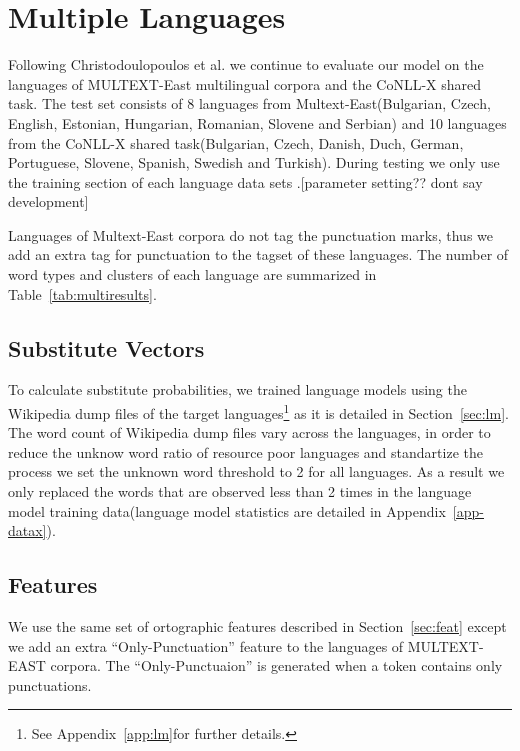 \section{Multiple Languages}
 

Following Christodoulopoulos et
al.  we
continue to evaluate our model on the languages of MULTEXT-East
\cite{citeulike:5820223} multilingual corpora and the
CoNLL-X \cite{Buchholz:2006:CST:1596276.1596305} shared task.  The test
set consists of 8 languages from Multext-East(Bulgarian, Czech,
English, Estonian, Hungarian, Romanian, Slovene and Serbian) and 10
languages from the CoNLL-X shared task(Bulgarian, Czech, Danish, Duch,
German, Portuguese, Slovene, Spanish, Swedish and Turkish).  During
testing we only use the training section of each language data sets
\cite{Lee:2010:STU:1870658.1870741}.[parameter setting?? dont say
  development]

Languages of Multext-East corpora do not tag the punctuation marks,
thus we add an extra tag for punctuation to the tagset of these
languages.  The number of word types and clusters of each language are
summarized in Table~\ref{tab:multiresults}.

\subsection{Substitute Vectors}
To calculate substitute probabilities, we trained language models
using the Wikipedia dump files of the target languages\footnote{See
  Appendix~\ref{app:lm}for further details.}  as it is detailed in
Section~\ref{sec:lm}.  The word count of Wikipedia dump files vary
across the languages, in order to reduce the unknow word ratio of
resource poor languages and standartize the process we set the unknown
word threshold to 2 for all languages.  As a result we only replaced
the words that are observed less than 2 times in the language model
training data(language model statistics are detailed in
Appendix~\ref{app-datax}).

\subsection{Features}
We use the same set of ortographic features described in
Section~\ref{sec:feat} except we add an extra ``Only-Punctuation''
feature to the languages of MULTEXT-EAST corpora.  The
``Only-Punctuaion'' is generated when a token contains only
punctuations.  

